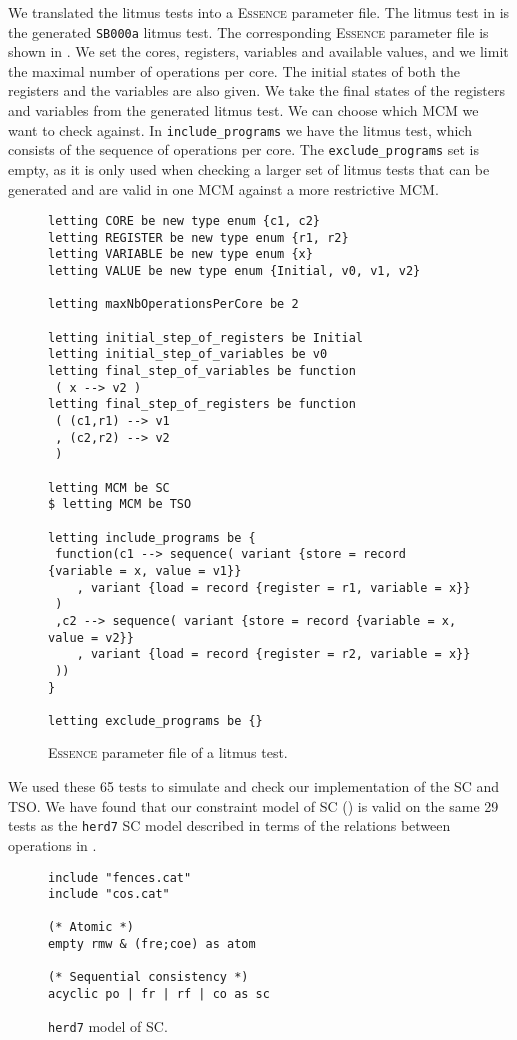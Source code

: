 \documentclass[runningheads]{llncs}
\newcommand{\essence}[0]{\textsc{Essence}}
\begin{document}
We translated the litmus tests into a \essence{} parameter file.
The litmus test in  is the generated {\tt{SB000a}} litmus test.
The corresponding \essence{} parameter file is shown in .
We set the cores, registers, variables and available values, and we limit the maximal number of operations per core.
The initial states of both the registers and the variables are also given.
We take the final states of the registers and variables from the generated litmus test.
We can choose which MCM we want to check against.
In {\tt{include\_programs}} we have the litmus test, which consists of the sequence of operations per core.
The {\tt{exclude\_programs}} set is empty, as it is only used when checking a larger set of litmus tests that can be generated and are valid in one MCM against a more restrictive MCM.

\begin{figure}
\begin{lstlisting}
letting CORE be new type enum {c1, c2}
letting REGISTER be new type enum {r1, r2}
letting VARIABLE be new type enum {x}
letting VALUE be new type enum {Initial, v0, v1, v2}

letting maxNbOperationsPerCore be 2

letting initial_step_of_registers be Initial
letting initial_step_of_variables be v0
letting final_step_of_variables be function
 ( x --> v2 )
letting final_step_of_registers be function
 ( (c1,r1) --> v1
 , (c2,r2) --> v2
 )

letting MCM be SC
$ letting MCM be TSO

letting include_programs be {
 function(c1 --> sequence( variant {store = record {variable = x, value = v1}}
    , variant {load = record {register = r1, variable = x}}
 )
 ,c2 --> sequence( variant {store = record {variable = x, value = v2}}
    , variant {load = record {register = r2, variable = x}}
 ))
}

letting exclude_programs be {}
\end{lstlisting}
\caption{\essence{} parameter file of a litmus test.\label{fig:essenceparam}}
\end{figure}


We used these 65 tests to simulate and check our implementation of the SC and TSO.
We have found that our constraint model of SC () is valid on the same 29 tests as the {\tt{herd7}} SC model described in terms of the relations between operations in .

\begin{figure}
\begin{lstlisting}
include "fences.cat"
include "cos.cat"

(* Atomic *)
empty rmw & (fre;coe) as atom

(* Sequential consistency *)
acyclic po | fr | rf | co as sc
\end{lstlisting}
\caption{{\tt{herd7}} model of SC.\label{fig:herdSC}}
\end{figure}
\end{document}
